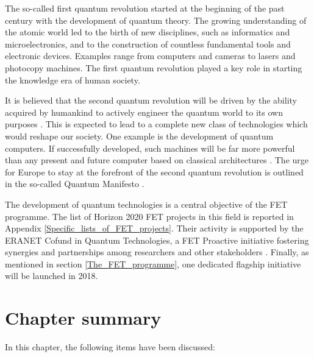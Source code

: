 The so-called first quantum revolution started at the beginning of the past century with the development of quantum theory. The growing understanding of the atomic world led to the birth of new disciplines, such as informatics and microelectronics, and to the construction of countless fundamental tools and electronic devices. Examples range from computers and cameras to lasers and photocopy machines. The first quantum revolution played a key role in starting the knowledge era of human society.

It is believed that the second quantum revolution will be driven by the ability acquired by humankind to actively engineer the quantum world to its own purposes \cite{Dowling}. This is expected to lead to a complete new class of technologies which would reshape our society. One example is the development of quantum computers. If successfully developed, such machines will be far more powerful than any present and future computer based on classical architectures \cite{Rieffel}. The urge for Europe to stay at the forefront of the second quantum revolution is outlined in the so-called Quantum Manifesto \cite{QuantumManifesto}.

The development of quantum technologies is a central objective of the FET programme.  The list of Horizon 2020 FET projects in this field is reported in Appendix \ref{Specific_lists_of_FET_projects}. Their activity is supported by the ERANET Cofund in Quantum Technologies, a FET Proactive initiative fostering synergies and partnerships among researchers and other stakeholders \cite{ERANET}. Finally, as mentioned in section \ref{The_FET_programme}, one dedicated flagship initiative will be launched in 2018. 

\section{Chapter summary} 
In this chapter, the following items have been discussed:

